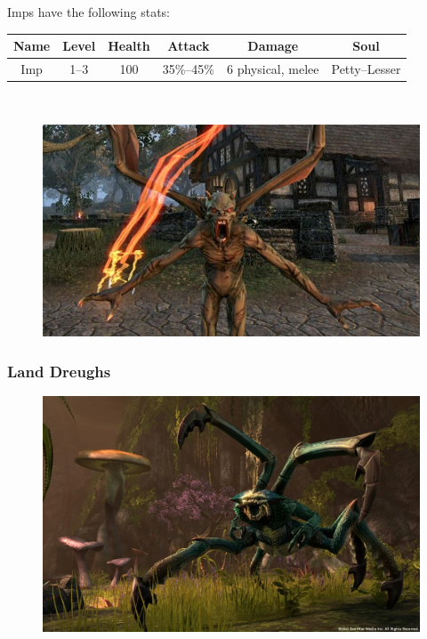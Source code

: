 \documentclass[12pt]{book}
\begin{document}
Imps have the following stats:

\begin{tabular}{|c|c|c|c|c|c|}
\hline
Name & Level & Health & Attack & Damage & Soul\\ \hline
Imp & 1--3 & 100 & 35\%--45\% & 6 physical, melee & Petty--Lesser\\ \hline
\end{tabular}\\

\begin{figure}
	\centering
	\includegraphics[scale=0.75]{imp.png}
\end{figure}

\subsubsection{Land Dreughs}

\begin{figure}[h]
	\centering
	\includegraphics[scale=0.5]{dreugh.png}
\end{figure}
\end{document}

